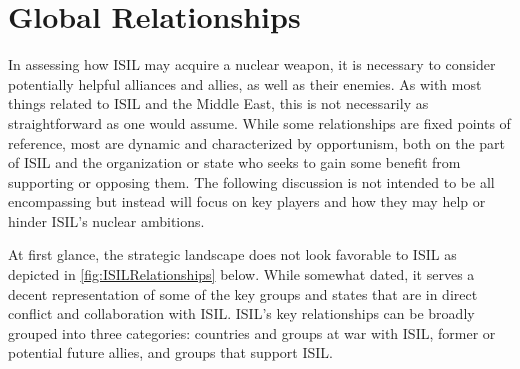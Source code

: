 \documentclass{report}
\begin{document}
\section{Global Relationships} \label{sec:global_rels}





In assessing how ISIL may acquire a nuclear weapon, it is necessary to consider potentially helpful alliances and allies, as well as their enemies.  As with most things related to ISIL and the Middle East, this is not necessarily as straightforward as one would assume.  While some relationships are fixed points of reference, most are dynamic and characterized by opportunism, both on the part of ISIL and the organization or state who seeks to gain some benefit from supporting or opposing them.  The following discussion is not intended to be all encompassing but instead will focus on key players and how they may help or hinder ISIL's nuclear ambitions.  

At first glance, the strategic landscape does not look favorable to ISIL as depicted in \autoref{fig:ISILRelationships} below.  While somewhat dated, it serves a decent representation of some of the key groups and states that are in direct conflict and collaboration with ISIL.  ISIL's key relationships can be broadly grouped into three categories:  countries and groups at war with ISIL, former or potential future allies, and groups that support ISIL.  
\end{document}

